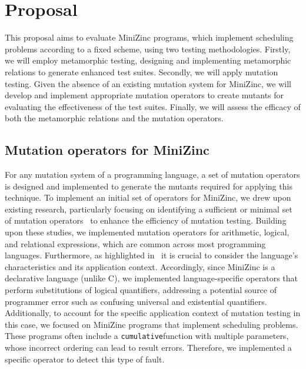\section{Proposal}
This proposal aims to evaluate MiniZinc programs, which implement scheduling problems according to a fixed scheme, using two testing methodologies. Firstly, we will employ metamorphic testing, designing and implementing metamorphic relations to generate enhanced test suites. Secondly, we will apply mutation testing. Given the absence of an existing mutation system for MiniZinc, we will develop and implement appropriate mutation operators to create mutants for evaluating the effectiveness of the test suites. Finally, we will assess the efficacy of both the metamorphic relations and the mutation operators.

\subsection{Mutation operators for MiniZinc}

For any mutation system of a programming language, a set of mutation operators is designed and implemented to generate the mutants required for applying this technique. To implement an initial set of operators for MiniZinc, we drew upon existing research, particularly focusing on identifying a sufficient or minimal set of mutation operators~\cite{Offutt96OpMut,Mresa99OpMut,PapadakisM10} to enhance the efficiency of mutation testing. Building upon these studies, we implemented mutation operators for arithmetic, logical, and relational expressions, which are common across most programming languages. Furthermore, as highlighted in~\cite{Mresa99OpMut} it is crucial to consider the language's characteristics and its application context. Accordingly, since MiniZinc is a declarative language (unlike C), we implemented language-specific operators that perform substitutions of logical quantifiers, addressing a potential source of programmer error such as confusing universal and existential quantifiers. Additionally, to account for the specific application context of mutation testing in this case, we focused on MiniZinc programs that implement scheduling problems. These programs often include a \texttt{cumulative}function with multiple parameters, whose incorrect ordering can lead to result errors. Therefore, we implemented a specific operator to detect this type of fault.\\

